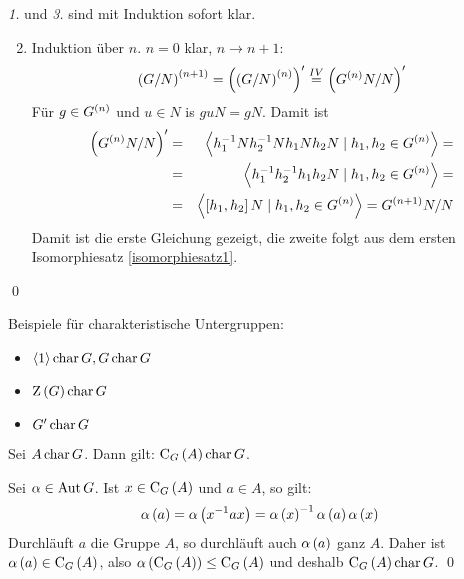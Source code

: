 \begin{beweis}
 \emph{1.} und \emph{3.} sind mit Induktion sofort klar.
 \begin{enumerate}
  \setcounter{enumi}{1}
  \item Induktion \"uber $n$. $n=0$ klar, $n \to n+1$:
   \begin{equation*}
    \left(G/N\right)^{\left(n+1\right)}=\left(\left(G/N\right)^{\left(n\right)}\right)'\stackrel{IV}{=}\left(G^{\left(n\right)}N/N\right)'
   \end{equation*}
   F\"ur $g \in G^{\left(n\right)}$ und $u\in N$ is $guN=gN$. Damit ist
   \begin{eqnarray*}
    \left(G^{\left(n\right)}N/N\right)'&=&\left<h_1^{-1}Nh_2^{-1}Nh_1Nh_2N \mid h_1,h_2 \in G^{\left(n\right)}\right>= \\&=&\left<h_1^{-1}h_2^{-1}h_1h_2N \mid h_1,h_2 \in G^{\left(n\right)}\right>=\\&=&\left<\left[h_1,h_2\right]N \mid h_1,h_2 \in G^{\left(n\right)}\right>=G^{\left(n+1\right)}N/N
   \end{eqnarray*}
   Damit ist die erste Gleichung gezeigt, die zweite folgt aus dem ersten Isomorphiesatz \ref{isomorphiesatz1}.
 \end{enumerate}
 \qed
\end{beweis}

\begin{beispiel*}
 Beispiele f\"ur charakteristische Untergruppen:
 \begin{itemize}
  \item $\left<1\right> \operatorname{char} G, G \operatorname{char} G$
  \item $\operatorname{Z}\left(G\right) \operatorname{char} G$
  \item $G' \operatorname{char} G$
 \end{itemize}
\end{beispiel*}

\begin{satz}
 Sei $A \operatorname{char} G$. Dann gilt: $\operatorname{C}_G\left(A\right) \operatorname{char} G$.
\end{satz}

\begin{beweis}
 Sei $\alpha \in \operatorname{Aut} G$. Ist $x \in \operatorname{C}_G\left(A\right)$ und $a \in A$, so gilt:
 \begin{equation*}
  \alpha\left(a\right) = \alpha\left(x^{-1}ax\right)=\alpha\left(x\right)^{-1}\alpha\left(a\right)\alpha\left(x\right)
 \end{equation*}
 Durchl\"auft $a$ die Gruppe $A$, so durchl\"auft auch $\alpha\left(a\right)$ ganz $A$. Daher ist $\alpha\left(a\right) \in \operatorname{C}_G\left(A\right)$, also $\alpha\left(\operatorname{C}_G\left(A\right)\right) \leq \operatorname{C}_G\left(A\right)$ und deshalb $\operatorname{C}_G\left(A\right) \operatorname{char} G$.
 \qed
\end{beweis}

